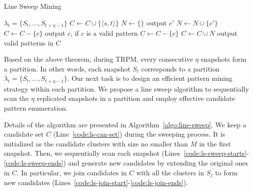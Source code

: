 \begin{algorithm}[h]
\small
\caption{Line Sweep Mining}
\label{algo:line-sweep}
\begin{algorithmic}[1]
\Require $\lambda_t = \{S_t, ..., S_{t+\eta-1}\}$
  \label{code:ls-can-set}
\label{code:ls-init-start}
\State $C\leftarrow C\cup \{\langle s, t \rangle \}$
\EndIf
\EndFor
\label{code:ls-init-end}
 \label{code:ls-sweep-starts}
	\State $N \gets \{\}$
	 \label{code:ls-join-start}
		 \label{code:ls-join}
			\State output $c'$
			\State $N\leftarrow N\cup \{c'\}$ \label{code:ls-m-prun}	
		\EndIf
	\EndFor \label{code:ls-join-ends}
		\label{code:ls-g-prune-starts}
			\State $C\leftarrow C-\{c\}$ 
			\State output $c$, if $c$ is a valid pattern
		\EndIf  \label{code:ls-g-prune-ends}
		\label{code:ls-l-prune-starts}
			\State $C\leftarrow C-\{c\}$ 
		\EndIf\label{code:ls-l-prune-ends}
	\EndFor
	\State $C\leftarrow C\cup N$
\EndFor\label{code:ls-sweep-ends}
\State output valid patterns in  $C$  \label{code:ls-valid-check}
\end{algorithmic}
\end{algorithm}



Based on the above theorem, during TRPM, every consecutive $\eta$ snapshots
form a partition. In other words, each snapshot $S_t$ corresponds to a partition $\lambda_t=\{S_t,...,S_{t+\eta-1}\}$. Our next task is to design an efficient pattern mining strategy within each partition. We propose a line sweep algorithm to sequentially scan the $\eta$ replicated snapshots in a partition and employ effective candidate pattern enumeration.  

Details of the algorithm are presented in Algorithm~\ref{algo:line-sweep}. We keep a candidate set $C$ (Line~\ref{code:ls-can-set}) during the sweeping process. It is initialized as the candidate clusters with size no smaller than $M$ in the first snapshot. Then, we sequentially scan each snapshot (Lines~\ref{code:ls-sweep-starts}-\ref{code:ls-sweep-ends}) and generate new candidates by extending the original ones in $C$.
In particular, we join candidates in $C$ with all the clusters in $S_j$ to form new candidates (Lines~\ref{code:ls-join-start}-\ref{code:ls-join-ends}). 

